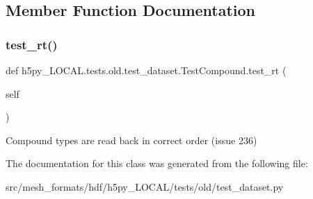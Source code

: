 \subsection{Member Function Documentation}
\mbox{\label{classh5py__LOCAL_1_1tests_1_1old_1_1test__dataset_1_1TestCompound_a47d6c406ac4def451ba8d75a3efff3e9}} 
\subsubsection{\texorpdfstring{test\+\_\+rt()}{test\_rt()}}
{\footnotesize\ttfamily def h5py\+\_\+\+L\+O\+C\+A\+L.\+tests.\+old.\+test\+\_\+dataset.\+Test\+Compound.\+test\+\_\+rt (\begin{DoxyParamCaption}\item[{}]{self }\end{DoxyParamCaption})}

\begin{DoxyVerb}Compound types are read back in correct order (issue 236)\end{DoxyVerb}
 

The documentation for this class was generated from the following file\+:\begin{DoxyCompactItemize}
\item 
src/mesh\+\_\+formats/hdf/h5py\+\_\+\+L\+O\+C\+A\+L/tests/old/test\+\_\+dataset.\+py\end{DoxyCompactItemize}
